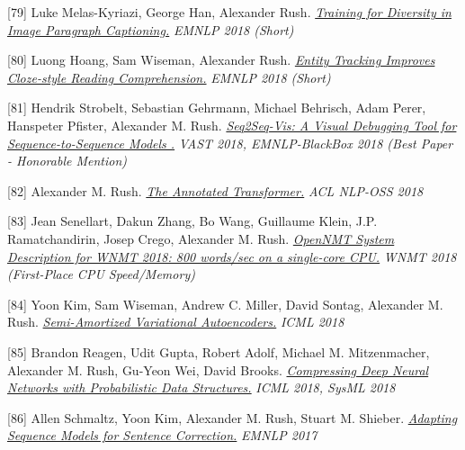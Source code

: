 \documentclass[10pt]{article}
\begin{document}
\medskip


[79] \ind Luke Melas-Kyriazi, George Han, Alexander Rush. \emph{\href{ https://www.aclweb.org/anthology/D18-1084 }{ Training for Diversity in Image Paragraph Captioning.} }\emph{ EMNLP 2018 (Short) }

\medskip


[80] \ind Luong Hoang, Sam Wiseman, Alexander Rush. \emph{\href{ https://www.aclweb.org/anthology/D18-1130 }{ Entity Tracking Improves Cloze-style Reading Comprehension.} }\emph{ EMNLP 2018 (Short) }

\medskip


[81] \ind Hendrik Strobelt, Sebastian Gehrmann, Michael Behrisch, Adam Perer, Hanspeter Pfister, Alexander M. Rush. \emph{\href{ https://arxiv.org/abs/1804.09299 }{ Seq2Seq-Vis: A Visual Debugging Tool for Sequence-to-Sequence Models .} }\emph{ VAST 2018, EMNLP-BlackBox 2018 (Best Paper - Honorable Mention) }

\medskip


[82] \ind Alexander M. Rush. \emph{\href{ http://aclweb.org/anthology/W18-2509 }{ The Annotated Transformer.} }\emph{ ACL NLP-OSS 2018 }

\medskip


[83] \ind Jean Senellart, Dakun Zhang, Bo Wang, Guillaume Klein, J.P. Ramatchandirin, Josep Crego, Alexander M. Rush. \emph{\href{ http://aclweb.org/anthology/W18-2715 }{ OpenNMT System Description for WNMT 2018: 800 words/sec on a single-core CPU.} }\emph{ WNMT 2018  (First-Place CPU Speed/Memory) }

\medskip


[84] \ind Yoon Kim, Sam Wiseman, Andrew C. Miller, David Sontag, Alexander M. Rush. \emph{\href{ https://arxiv.org/abs/1802.02550 }{ Semi-Amortized Variational Autoencoders.} }\emph{ ICML 2018 }

\medskip


[85] \ind Brandon Reagen, Udit Gupta, Robert Adolf, Michael M. Mitzenmacher, Alexander M. Rush, Gu-Yeon Wei, David Brooks. \emph{\href{ https://www.sysml.cc/doc/68.pdf }{ Compressing Deep Neural Networks with Probabilistic Data Structures.} }\emph{ ICML 2018, SysML 2018 }

\medskip


[86] \ind Allen Schmaltz, Yoon Kim, Alexander M. Rush, Stuart M. Shieber. \emph{\href{ https://arxiv.org/abs/1707.09067 }{ Adapting Sequence Models for Sentence Correction.} }\emph{ EMNLP 2017 }

\medskip
\end{document}

